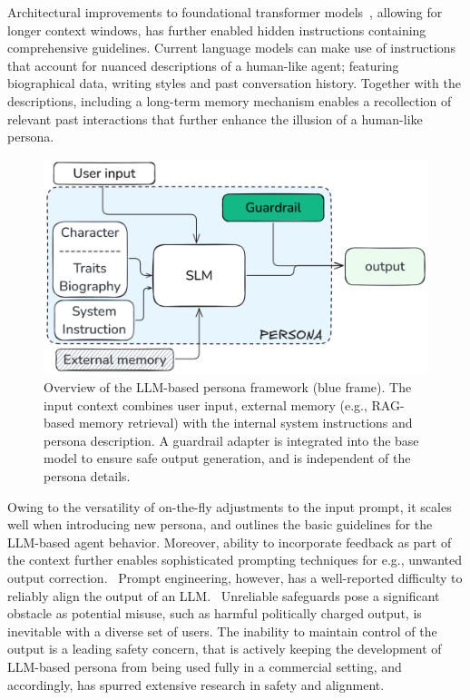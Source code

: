 \documentclass[letterpaper]{article}
\begin{document}
Architectural improvements to foundational transformer models~\cite{vaswani2017attention}, allowing for longer context windows, has further enabled hidden instructions containing comprehensive guidelines. Current language models can make use of instructions that account for nuanced descriptions of a human-like agent; featuring biographical data, writing styles and past conversation history. 
Together with the descriptions, including a long-term memory mechanism enables a recollection of relevant past interactions that further enhance the illusion of a human-like persona.~\cite{ishikawacapturing} 
\begin{figure}[H]
	\centering
	\includegraphics[width=1.0\linewidth]{figures/introductionDiagram.png}
	\caption{Overview of the LLM-based persona framework (blue frame). The input context combines user input, external memory (e.g., RAG-based memory retrieval) with the internal system instructions and persona description. A guardrail adapter is integrated into the base model to ensure safe output generation, and is independent of the persona details.}\label{fig:introduction-diagram}
\end{figure}

Owing to the versatility of on-the-fly adjustments to the input prompt, it scales well when introducing new persona, and outlines the basic guidelines for the LLM-based agent behavior.
Moreover, ability to incorporate feedback as part of the context further enables sophisticated prompting techniques for e.g., unwanted output correction.~\cite{schulhoff2024prompt}
Prompt engineering, however, has a well-reported difficulty to reliably align the output of an LLM.~\cite{bhargava2023s, cao2024worst}  
Unreliable safeguards pose a significant obstacle as potential misuse, such as harmful politically charged output, is inevitable with a diverse set of users.
The inability to maintain control of the output is a leading safety concern, that is actively keeping the development of LLM-based persona from being used fully in a commercial setting, and accordingly, has spurred extensive research in safety and alignment.~\cite{ghosh2024aegis,zeng2024shieldgemma,han2024wildguard,inan2023llama}
\end{document}
